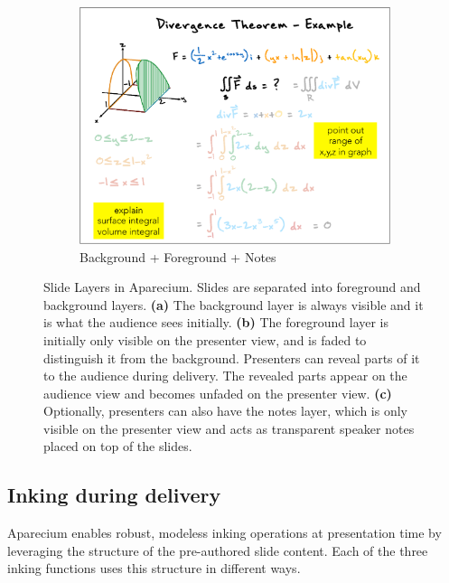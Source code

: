 \begin{figure}[h!]
    ~
        \begin{subfigure}[t]{0.31\textwidth}
        \centering
        \includegraphics[width=1\columnwidth]{figures/videoslide3}
        \captionsetup{font=footnotesize}
        \caption{Background + Foreground + Notes}
    \end{subfigure}
    \caption{Slide Layers in Aparecium. Slides are separated into foreground and background layers. \textbf{(a)} The background layer is always visible and it is what the audience sees initially. \textbf{(b)} The foreground layer is initially only visible on the presenter view, and is faded to distinguish it from the background. Presenters can reveal parts of it to the audience during delivery. The revealed parts appear on the audience view and becomes unfaded on the presenter view. \textbf{(c)} Optionally, presenters can also have the notes layer, which is only visible on the presenter view and acts as transparent speaker notes placed on top of the slides. }
    \label{fig:slidelayers}
\end{figure}

\subsection{Inking during delivery}
%
Aparecium enables robust, modeless inking operations at presentation time by leveraging the structure of the pre-authored slide content. Each of the three inking functions uses this structure in different ways. 
